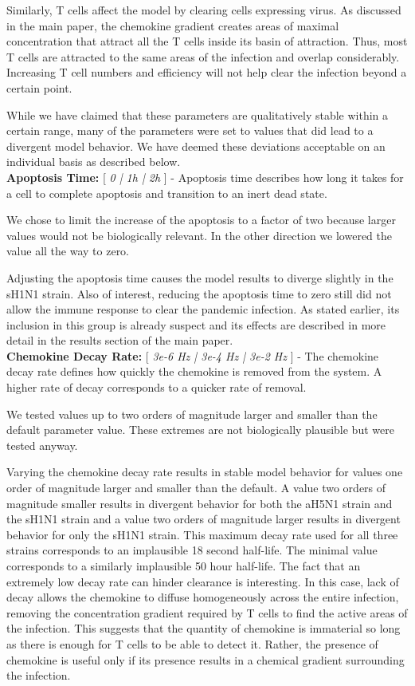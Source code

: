 \documentclass[10pt]{article}
\begin{document}
Similarly, T cells affect the model by clearing cells expressing virus.  As discussed in the main paper, the chemokine gradient creates areas of maximal concentration that attract all the T cells inside its basin of attraction.  Thus, most T cells are attracted to the same areas of the infection and overlap considerably.  Increasing T cell numbers and efficiency will not help clear the infection beyond a certain point.

While we have claimed that these parameters are qualitatively stable within a certain range, many of the parameters were set to values that did lead to a divergent model behavior.  We have deemed these deviations acceptable on an individual basis as described below. \\


\textbf{Apoptosis Time:} [ \textit{0 | 1h | 2h} ] - Apoptosis time describes how long it takes for a cell to complete apoptosis and transition to an inert dead state.  

We chose to limit the increase of the apoptosis to a factor of two because larger values would not be biologically relevant.  In the other direction we lowered the value all the way to zero. 

Adjusting the apoptosis time causes the model results to diverge slightly in the sH1N1 strain.  Also of interest, reducing the apoptosis time to zero still did not allow the immune response to clear the pandemic infection.  As stated earlier, its inclusion in this group is already suspect and its effects are described in more detail in the results section of the main paper. \\


\textbf{Chemokine Decay Rate:} [ \textit{3e-6 Hz |  3e-4 Hz | 3e-2 Hz} ] - The chemokine decay rate defines how quickly the chemokine is removed from the system.  A higher rate of decay corresponds to a quicker rate of removal.

We tested values up to two orders of magnitude larger and smaller than the default parameter value.  These extremes are not biologically plausible but were tested anyway.

Varying the chemokine decay rate results in stable model behavior for values one order of magnitude larger and smaller than the default.  A value two orders of magnitude smaller results in divergent behavior for both the aH5N1 strain and the sH1N1 strain and a value two orders of magnitude larger results in divergent behavior for only the sH1N1 strain.  This maximum decay rate used for all three strains corresponds to an implausible 18 second half-life.  The minimal value corresponds to a similarly implausible 50 hour half-life.  The fact that an extremely low decay rate can hinder clearance is interesting.  In this case, lack of decay allows the chemokine to diffuse homogeneously across the entire infection, removing the concentration gradient required by T cells to find the active areas of the infection.  This suggests that the quantity of chemokine is immaterial so long as there is enough for T cells to be able to detect it.  Rather, the presence of chemokine is useful only if its presence results in a chemical gradient surrounding the infection. \\
\end{document}
